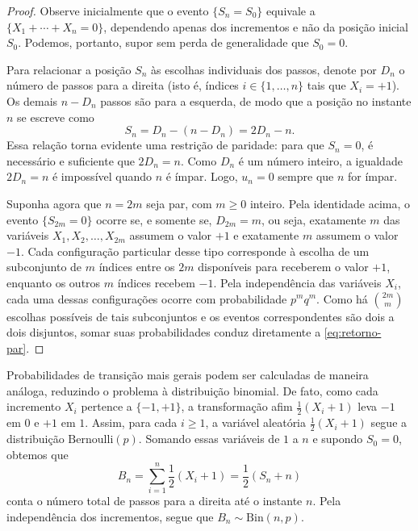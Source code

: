 \documentclass[12pt,portuguese]{article}
\theoremstyle{definition}
\theoremstyle{plainexercise}
\theoremstyle{starredexercise}
\theoremstyle{definition}
\begin{document}
\begin{proof}
Observe inicialmente que o evento $\{S_n = S_0\}$ equivale a
$\{X_1 + \cdots + X_n = 0\}$, dependendo apenas dos incrementos e não da
posição inicial $S_0$. Podemos, portanto, supor sem perda de generalidade
que $S_0 = 0$.

Para relacionar a posição $S_n$ às escolhas individuais dos passos, denote por
$D_n$ o número de passos para a direita (isto é, índices $i \in \{1, \ldots, n\}$
tais que $X_i = +1$). Os demais $n - D_n$ passos são para a esquerda, de modo
que a posição no instante $n$ se escreve como
\[
  S_n = D_n - (n - D_n) = 2D_n - n.
\]
Essa relação torna evidente uma restrição de paridade: para que $S_n = 0$, é
necessário e suficiente que $2D_n = n$. Como $D_n$ é um número inteiro, a
igualdade $2D_n = n$ é impossível quando $n$ é ímpar. Logo, $u_n = 0$ sempre
que $n$ for ímpar.

Suponha agora que $n = 2m$ seja par, com $m \geqslant 0$ inteiro. Pela
identidade acima, o evento $\{S_{2m} = 0\}$ ocorre se, e somente se,
$D_{2m} = m$, ou seja, exatamente $m$ das variáveis $X_1, X_2, \ldots, X_{2m}$
assumem o valor $+1$ e exatamente $m$ assumem o valor $-1$. Cada configuração
particular desse tipo corresponde à escolha de um subconjunto de $m$ índices
entre os $2m$ disponíveis para receberem o valor $+1$, enquanto os outros
$m$ índices recebem $-1$. Pela independência das variáveis $X_i$, cada uma
dessas configurações ocorre com probabilidade $p^m q^m$. Como há
$\binom{2m}{m}$ escolhas possíveis de tais subconjuntos e os eventos
correspondentes são dois a dois disjuntos, somar suas probabilidades conduz
diretamente a \eqref{eq:retorno-par}.
\end{proof}

Probabilidades de transição mais gerais podem ser calculadas de maneira
análoga, reduzindo o problema à distribuição binomial. De fato, como cada
incremento $X_i$ pertence a $\{-1, +1\}$, a transformação afim
$\tfrac{1}{2}(X_i + 1)$ leva $-1$ em $0$ e $+1$ em $1$. Assim, para cada
$i \geqslant 1$, a variável aleatória $\tfrac{1}{2}(X_i + 1)$ segue a
distribuição $\mathrm{Bernoulli}(p)$. Somando essas variáveis de $1$ a $n$ e
supondo $S_0 = 0$, obtemos que
\[
  B_n = \sum_{i=1}^{n} \frac{1}{2}(X_i + 1) = \frac{1}{2}(S_n + n)
\]
conta o número total de passos para a direita até o instante $n$. Pela
independência dos incrementos, segue que $B_n \sim \mathrm{Bin}(n, p)$.
\end{document}
